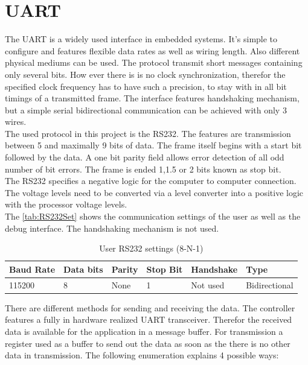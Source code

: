 \section{\acs{UART}}
\label{sec:RS232}
The \acf{UART} is a widely used interface in embedded systems. It's simple to configure and features flexible data rates as well as wiring length. Also different physical mediums can be used. The protocol transmit short messages containing only several bits. How ever there is is no clock synchronization, therefor the specified clock frequency has to have such a precision, to stay with in all bit timings of a transmitted frame. The interface features handshaking mechanism, but a simple serial bidirectional communication can be achieved with only 3 wires.\\
The used protocol in this project is the RS232. The features are transmission between 5 and maximally 9 bits of data. The frame itself begins with a start bit followed by the data. A one bit parity field allows error detection of all odd number of bit errors. The frame is ended 1,1.5 or 2 bits known as stop bit.\\
The RS232 specifies a negative logic for the computer to computer connection. The voltage levels need to be converted via a level converter into a positive logic with the processor voltage levels.\\
The \autoref{tab:RS232Set} shows the communication settings of the user as well as the debug interface. The handshaking mechanism is not used.\\

\begin{table}[H]
\begin{tabularx}{\textwidth}{llllll} %
\textbf{Baud Rate}	 &\textbf{Data bits}  &\textbf{Parity} &\textbf{Stop Bit}&\textbf{Handshake}& \textbf{Type} \\
\hline
\hline
115200&8	& None & 1& Not used & Bidirectional\\
\end{tabularx}
\caption{User RS232 settings (8-N-1)}
\label{tab:RS232Set}
\end{table}

There are different methods for sending and receiving the data. The controller features a fully in hardware realized \ac{UART} transceiver. Therefor the received data is available for the application in a message buffer. For transmission a register used as a buffer to send out the data as soon as the there is no other data in transmission. The following enumeration explains 4 possible ways:

